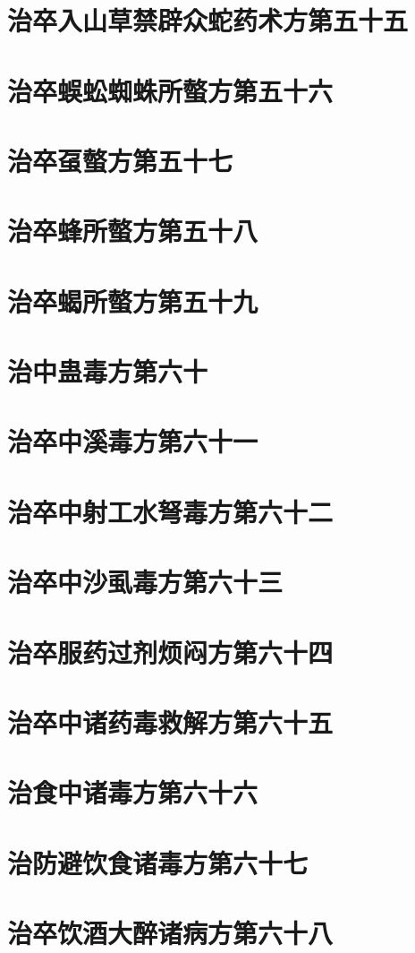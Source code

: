 \documentclass[12pt,UTF8]{ctexbook}
\begin{document}
\chapter{治卒入山草禁辟众蛇药术方第五十五}
\chapter{治卒蜈蚣蜘蛛所螫方第五十六}
\chapter{治卒虿螫方第五十七}
\chapter{治卒蜂所螫方第五十八}
\chapter{治卒蝎所螫方第五十九}
\chapter{治中蛊毒方第六十}
\chapter{治卒中溪毒方第六十一}
\chapter{治卒中射工水弩毒方第六十二}
\chapter{治卒中沙虱毒方第六十三}
\chapter{治卒服药过剂烦闷方第六十四}
\chapter{治卒中诸药毒救解方第六十五}
\chapter{治食中诸毒方第六十六}
\chapter{治防避饮食诸毒方第六十七}
\chapter{治卒饮酒大醉诸病方第六十八}
\end{document}
